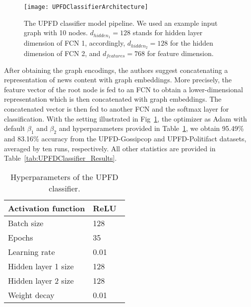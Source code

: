 \begin{figure}
    \centering
    \texttt{[image: UPFDClassifierArchitecture]}
    \caption[The UPFD classifier model pipeline.]{The UPFD classifier model pipeline. We used an example input graph with 10 nodes. $d_{hidden_1} = 128$ stands for hidden layer dimension of FCN 1, accordingly, $d_{hidden_2} = 128$ for the hidden dimension of FCN 2, and $d_{features} = 768$ for feature dimension.}
    \label{fig:UPFDClassifierArchitecture}
\end{figure}
After obtaining the graph encodings, the authors suggest concatenating a representation of news content with graph embeddings. More precisely, the feature vector of the root node is fed to an FCN to obtain a lower-dimensional representation which is then concatenated with graph embeddings. The concatenated vector is then fed to another FCN and the softmax layer for classification. With the setting illustrated in Fig~\ref{fig:UPFDClassifierArchitecture}, the optimizer as Adam with default $\beta_1$ and $\beta_2$ and hyperparameters provided in Table~\ref{tab:UPFDClassifier_Hyperparameters}, we obtain 95.49\% and 83.16\% accuracy from the UPFD-Gossipcop and UPFD-Politifact datasets, averaged by ten runs, respectively. All other statistics are provided in Table~\ref{tab:UPFDClassifier_Results}.\\
\begin{table}
    \centering
    \begin{tabular}{|l|l|}
        \hline
        Activation function & ReLU~\parencite{ReLU_Nair} \\
        \hline
        Batch size          & 128                        \\
        \hline
        Epochs              & 35                         \\
        \hline
        Learning rate       & 0.01                       \\
        \hline
        Hidden layer 1 size & 128                        \\
        \hline
        Hidden layer 2 size & 128                        \\
        \hline
        Weight decay        & 0.01                       \\
        \hline
    \end{tabular}
    \caption[Hyperparameters of the UPFD classifier.]{Hyperparameters of the UPFD classifier.}
    \label{tab:UPFDClassifier_Hyperparameters}
\end{table}
